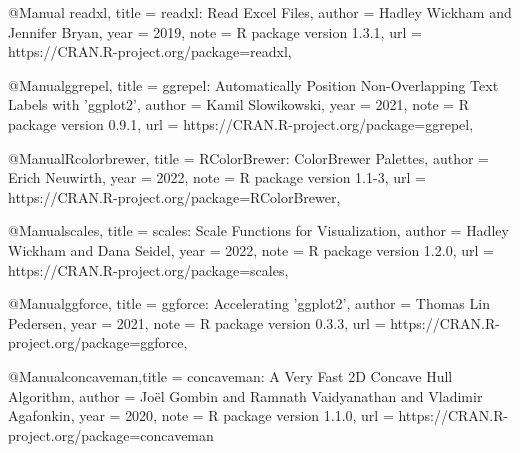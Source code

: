     @Manual{ readxl,
    title = {readxl: Read Excel Files},
    author = {Hadley Wickham and Jennifer Bryan},
    year = {2019},
    note = {R package version 1.3.1},
    url = {https://CRAN.R-project.org/package=readxl},
  }
  
    @Manual{ggrepel,
    title = {ggrepel: Automatically Position Non-Overlapping Text Labels with
'ggplot2'},
    author = {Kamil Slowikowski},
    year = {2021},
    note = {R package version 0.9.1},
    url = {https://CRAN.R-project.org/package=ggrepel},
  }
  
  @Manual{Rcolorbrewer,
    title = {RColorBrewer: ColorBrewer Palettes},
    author = {Erich Neuwirth},
    year = {2022},
    note = {R package version 1.1-3},
    url = {https://CRAN.R-project.org/package=RColorBrewer},
  }
  
    @Manual{scales,
    title = {scales: Scale Functions for Visualization},
    author = {Hadley Wickham and Dana Seidel},
    year = {2022},
    note = {R package version 1.2.0},
    url = {https://CRAN.R-project.org/package=scales},
  }
  
    @Manual{ggforce,
    title = {ggforce: Accelerating 'ggplot2'},
    author = {Thomas Lin Pedersen},
    year = {2021},
    note = {R package version 0.3.3},
    url = {https://CRAN.R-project.org/package=ggforce},
  }
  
  @Manual{concaveman,title = {concaveman: A Very Fast 2D Concave Hull Algorithm},
  author = {Joël Gombin and Ramnath Vaidyanathan and Vladimir Agafonkin}, year = {2020},
  note = {R package version 1.1.0},
  url = {https://CRAN.R-project.org/package=concaveman}
  }